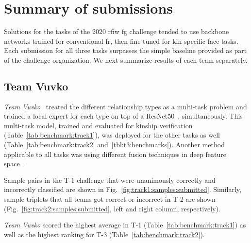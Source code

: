 \documentclass[letterpaper, 10 pt, conference]{ieeeconf}
\begin{document}
\section{Summary of submissions}

Solutions for the tasks of the 2020 \ac{rfiw} \ac{fg} challenge tended to use backbone networks trained for conventional \ac{fr}, then fine-tuned for kin-specific face tasks. Each submission for all three tasks surpasses the simple baseline provided as part of the challenge organization. We next summarize results of each team separately.

\subsection{Team Vuvko}
\emph{Team Vuvko}~\cite{id4} treated the different relationship types as a multi-task problem and trained a local expert for each type on top of a ResNet50~\cite{he2016deep}, simultaneously. This multi-task model, trained and evaluated for kinship verification (Table~\ref{tab:benchmark:track1}), was deployed for the other tasks as well (Table~\ref{tab:benchmark:track2} and~\ref{tbl:t3:benchmarks}). Another method applicable to all tasks was using different fusion techniques in deep feature space~\cite{id6, id8}. 

Sample pairs in the T-1 challenge that were unanimously correctly and incorrectly classified are shown in Fig.~\ref{fig:track1:samples:submitted}. Similarly, sample triplets that all teams got correct or incorrect in T-2 are shown (Fig.~\ref{fig:track2:samples:submitted}, left and right column, respectively).

\emph{Team Vuvko} scored the highest average in T-1 (Table~\ref{tab:benchmark:track1}) as well as the highest ranking for T-3 (Table~\ref{tab:benchmark:track2}). 
\end{document}
